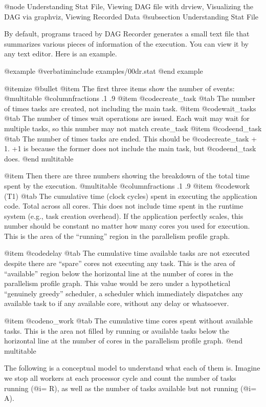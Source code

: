 @node Understanding Stat File, Viewing DAG file with drview, Visualizing the DAG via graphviz, Viewing Recorded Data
@subsection Understanding Stat File

By default, programs traced by DAG Recorder generates a small text file that summarizes various pieces of information of the execution.  You can view it by any text editor.  Here is an example.

@example
@verbatiminclude examples/00dr.stat
@end example

@itemize @bullet
@item The first three items show the number of events:
@multitable @columnfractions .1 .9
@item @code{create_task} @tab The number of times tasks are created, not including the main task.
@item @code{wait_tasks} @tab The number of times wait operations are issued. Each wait may wait for multiple tasks, so this number may not match create_task
@item @code{end_task} @tab The number of times tasks are ended. This should be @code{create_task} + 1.  +1 is because the former does not include the main task, but @code{end_task} does.
@end multitable

@item Then there are three numbers showing the breakdown of the total 
time spent by the execution.
@multitable @columnfractions .1 .9
@item @code{work (T1)} @tab The cumulative time (clock cycles) spent
in executing the application code.  Total across all cores.  This does
not include time spent in the runtime system (e.g., task creation
overhead).  If the application perfectly scales, this number should be
constant no matter how many cores you used for execution.  This is the
area of the ``running'' region in the parallelism profile graph.

@item @code{delay} @tab The cumulative time available tasks are not
executed despite there are ``spare'' cores not executing any task.  This
is the area of ``available'' region below the horizontal line at the
number of cores in the parallelism profile graph.  This value would be
zero under a hypothetical ``genuinely greedy'' scheduler, a scheduler
which immediately dispatches any available task to if any available
core, without any delay or whatsoever.

@item @code{no_work} @tab The cumulative time cores spent without available
tasks.  This is the area not filled by running or available tasks below
the horizontal line at the number of cores in the parallelism profile
graph.
@end multitable

The following is a conceptual model to understand what each of them is.
Imagine we stop all workers at each processor cycle and count the number
of tasks running (@i{= R}), as well as the number of tasks available but
not running (@i{= A}).

